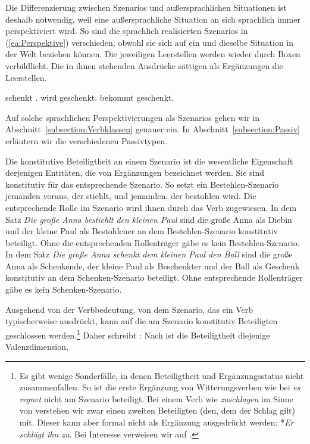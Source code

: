 Die Differenzierung zwischen Szenarios und außersprachlichen Situationen ist deshalb notwendig, weil eine außersprachliche Situation an sich sprachlich immer perspektiviert wird. So sind die sprachlich realisierten Szenarios in (\ref{ea:Perspektive}) verschieden, obwohl sie sich auf ein und dieselbe Situation in der Welt beziehen können. Die jeweiligen Leerstellen werden wieder durch Boxen verbildlicht. Die in ihnen stehenden Ausdrücke sättigen als Ergänzungen die Leerstellen.

\ea \label{ea:Perspektive}
\ea \label{ea:schenkenAktivPerspektive}  schenkt  .
\ex \label{ex:geschenktwerdenPerspektive}  wird  geschenkt.
\ex \label{ex:geschenktbekommenPerspektive}  bekommt  geschenkt.
\z 
\z 

Auf solche sprachlichen Perspektivierungen als Szenarios  gehen wir in Abschnitt~\ref{subsection:Verbklassen} genauer ein. In Abschnitt~\ref{subsection:Passiv} erläutern wir die verschiedenen Passivtypen. 

Die konstitutive Beteiligtheit an einem Szenario ist die wesentliche Eigenschaft derjenigen Entitäten, die von Ergänzungen bezeichnet werden. Sie sind konstitutiv für das entsprechende Szenario. So setzt ein Bestehlen-Szenario jemanden voraus, der stiehlt, und jemanden, der bestohlen wird. Die entsprechende Rolle im Szenario wird ihnen durch das Verb zugewiesen. In dem Satz \textit{Die große Anna bestiehlt den kleinen Paul} sind die große Anna als Diebin und der kleine Paul als Bestohlener an dem Bestehlen-Szenario konstitutiv beteiligt. Ohne die entsprechenden Rollenträger gäbe es kein Bestehlen-Szenario. In dem Satz \textit{Die große Anna schenkt dem kleinen Paul den Ball} sind die große Anna als Schenkende, der kleine Paul als Beschenkter und der Ball als Geschenk konstitutiv an dem Schenken-Szenario beteiligt. Ohne entsprechende Rollenträger gäbe es kein Schenken-Szenario.

Ausgehend von der Verbbedeutung, von dem Szenario, das ein Verb typischerweise ausdrückt, kann auf die am Szenario konstitutiv Beteiligten geschlossen werden.\footnote{Es gibt wenige Sonderfälle, in denen Beteiligtheit und Ergänzungsstatus nicht zusammenfallen. So ist \zB die erste Ergänzung von Witterungsverben wie bei \textit{es regnet} nicht am Szenario beteiligt. Bei einem Verb wie \textit{zuschlagen} im Sinne von  verstehen wir zwar einen zweiten Beteiligten (den, dem der Schlag gilt) mit. Dieser kann aber formal nicht als Ergänzung ausgedrückt werden: *\textit{Er schlägt ihn zu}. Bei Interesse verweisen wir auf \citet[263--264]{Fischer2001}.} Daher schreibt \citet[49]{Heringer84}:  Nach \citet[259]{Fischer2001} ist die Beteiligtheit diejenige Valenzdimension, 

